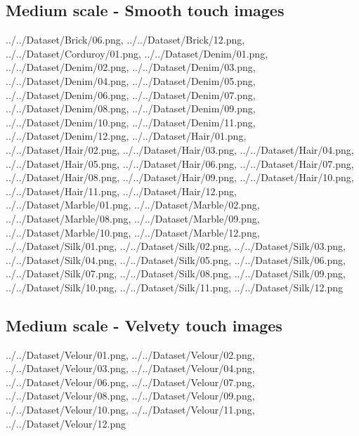 \subsection{Medium scale - Smooth touch images}
{../../Dataset/Brick/06.png,
../../Dataset/Brick/12.png,
../../Dataset/Corduroy/01.png,
../../Dataset/Denim/01.png,
../../Dataset/Denim/02.png,
../../Dataset/Denim/03.png,
../../Dataset/Denim/04.png,
../../Dataset/Denim/05.png,
../../Dataset/Denim/06.png,
../../Dataset/Denim/07.png,
../../Dataset/Denim/08.png,
../../Dataset/Denim/09.png,
../../Dataset/Denim/10.png,
../../Dataset/Denim/11.png,
../../Dataset/Denim/12.png,
../../Dataset/Hair/01.png,
../../Dataset/Hair/02.png,
../../Dataset/Hair/03.png,
../../Dataset/Hair/04.png,
../../Dataset/Hair/05.png,
../../Dataset/Hair/06.png,
../../Dataset/Hair/07.png,
../../Dataset/Hair/08.png,
../../Dataset/Hair/09.png,
../../Dataset/Hair/10.png,
../../Dataset/Hair/11.png,
../../Dataset/Hair/12.png,
../../Dataset/Marble/01.png,
../../Dataset/Marble/02.png,
../../Dataset/Marble/08.png,
../../Dataset/Marble/09.png,
../../Dataset/Marble/10.png,
../../Dataset/Marble/12.png,
../../Dataset/Silk/01.png,
../../Dataset/Silk/02.png,
../../Dataset/Silk/03.png,
../../Dataset/Silk/04.png,
../../Dataset/Silk/05.png,
../../Dataset/Silk/06.png,
../../Dataset/Silk/07.png,
../../Dataset/Silk/08.png,
../../Dataset/Silk/09.png,
../../Dataset/Silk/10.png,
../../Dataset/Silk/11.png,
../../Dataset/Silk/12.png}

\newpage
\subsection{Medium scale - Velvety touch images}
{../../Dataset/Velour/01.png,
../../Dataset/Velour/02.png,
../../Dataset/Velour/03.png,
../../Dataset/Velour/04.png,
../../Dataset/Velour/06.png,
../../Dataset/Velour/07.png,
../../Dataset/Velour/08.png,
../../Dataset/Velour/09.png,
../../Dataset/Velour/10.png,
../../Dataset/Velour/11.png,
../../Dataset/Velour/12.png}